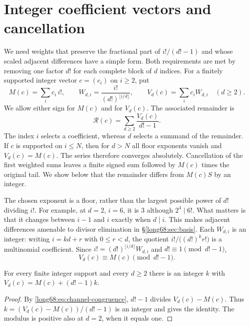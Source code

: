 \documentclass[11pt]{article}
\newcommand{\chn}[2]{V_{#1}(#2)}
\begin{document}
\section{Integer coefficient vectors and cancellation}\label{long68:sec:channels}

We need weights that preserve the fractional part of $i!/(d!-1)$
and whose scaled adjacent differences have a simple form. Both requirements
are met by removing one factor $d!$ for each complete block of $d$
indices. For a finitely supported integer vector $c=(c_i)$ on $i\ge2$,
put
\[
 M(c)=\sum_i c_i\,i!,\qquad
 W_{d,i}=\frac{i!}{(d!)^{\lfloor i/d\rfloor}},\qquad
 \chn dc=\sum_i c_iW_{d,i}\quad(d\ge2).
\]
We allow either sign for $M(c)$ and
for $V_d(c)$. The associated remainder is
\[
 \mathcal R(c)=\sum_{d\ge2}\frac{V_d(c)}{d!-1}.
\]
The index $i$ selects a coefficient, whereas $d$ selects a summand
of the remainder. If $c$ is supported on $i\le N$, then for $d>N$
all floor exponents vanish and $V_d(c)=M(c)$. The series therefore
converges absolutely. Cancellation of the first weighted sums leaves
a finite signed sum followed by $M(c)$ times the original tail.
We show below that the remainder differs from $M(c)S$ by an integer.

The chosen exponent is a floor, rather than the largest possible power
of $d!$ dividing $i!$. For example, at $d=2$, $i=6$, it is $3$
although $2^4\mid6!$. What matters is that it changes between $i-1$
and $i$ exactly when $d\mid i$. This makes adjacent differences
amenable to divisor elimination in \S\ref{long68:sec:basis}.
Each $W_{d,i}$ is an integer: writing $i=kd+r$ with $0\le r<d$, the quotient
$i!/\bigl((d!)^kr!\bigr)$ is a multinomial coefficient.  Since
$i!=(d!)^{\lfloor i/d\rfloor}W_{d,i}$ and $d!\equiv1\pmod{d!-1}$,
\begin{equation}\label{long68:eq:channel-congruence}
 \chn dc\equiv M(c)\pmod{d!-1}.
\end{equation}

\begin{theorem}\label{long68:res:normalform}
For every finite integer support and every $d\ge2$ there is an integer $k$
with $\chn dc=M(c)+(d!-1)k$.
\end{theorem}

\begin{proof}
By \eqref{long68:eq:channel-congruence}, $d!-1$ divides
$V_d(c)-M(c)$.  Thus $k=(V_d(c)-M(c))/(d!-1)$ is an integer and gives the
identity.  The modulus is positive also at $d=2$, when it equals one.
\end{proof}
\end{document}
